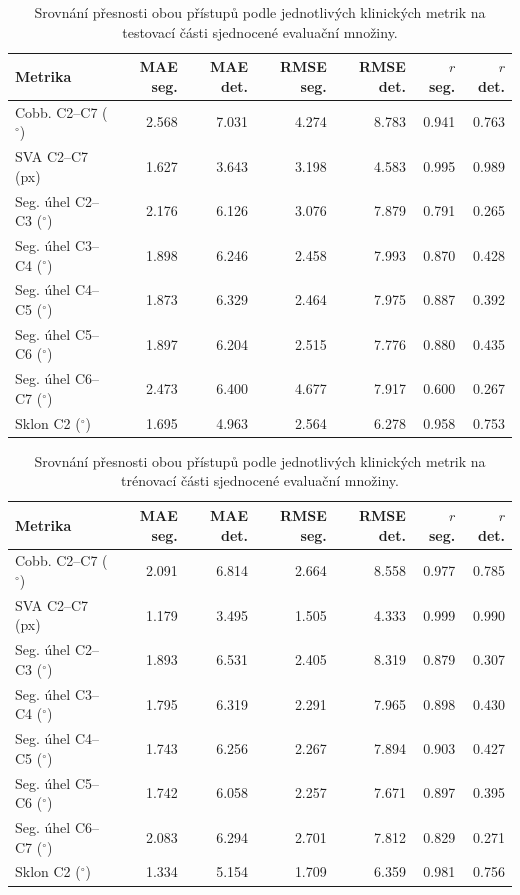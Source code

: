 \documentclass[male,czech,api_bc]{kitheses}
\begin{document}
\begin{table}[htbp]
\centering
\small
\caption{Srovnání přesnosti obou přístupů podle jednotlivých klinických metrik na testovací části sjednocené evaluační množiny.}
\label{tab:metric_comparison}
\begin{tabular}{p{3.3cm}rrrrrr}
\hline
Metrika & MAE seg. & MAE det. & RMSE seg. & RMSE det. & $r$ seg. & $r$ det. \\
\hline
Cobb. C2--C7 ($^\circ$) & 2.568 & 7.031 & 4.274 & 8.783 & 0.941 & 0.763 \\
SVA C2--C7 (px) & 1.627 & 3.643 & 3.198 & 4.583 & 0.995 & 0.989 \\
Seg. úhel C2--C3 ($^\circ$) & 2.176 & 6.126 & 3.076 & 7.879 & 0.791 & 0.265 \\
Seg. úhel C3--C4 ($^\circ$) & 1.898 & 6.246 & 2.458 & 7.993 & 0.870 & 0.428 \\
Seg. úhel C4--C5 ($^\circ$) & 1.873 & 6.329 & 2.464 & 7.975 & 0.887 & 0.392 \\
Seg. úhel C5--C6 ($^\circ$) & 1.897 & 6.204 & 2.515 & 7.776 & 0.880 & 0.435 \\
Seg. úhel C6--C7 ($^\circ$) & 2.473 & 6.400 & 4.677 & 7.917 & 0.600 & 0.267 \\
Sklon C2 ($^\circ$) & 1.695 & 4.963 & 2.564 & 6.278 & 0.958 & 0.753 \\
\hline
\end{tabular}
\normalsize
\end{table}

\begin{table}[htbp]
\centering
\small
\caption{Srovnání přesnosti obou přístupů podle jednotlivých klinických metrik na trénovací části sjednocené evaluační množiny.}
\label{tab:metric_comparison_train}
\begin{tabular}{p{3.3cm}rrrrrr}
\hline
Metrika & MAE seg. & MAE det. & RMSE seg. & RMSE det. & $r$ seg. & $r$ det. \\
\hline
Cobb. C2--C7 ($^\circ$) & 2.091 & 6.814 & 2.664 & 8.558 & 0.977 & 0.785 \\
SVA C2--C7 (px) & 1.179 & 3.495 & 1.505 & 4.333 & 0.999 & 0.990 \\
Seg. úhel C2--C3 ($^\circ$) & 1.893 & 6.531 & 2.405 & 8.319 & 0.879 & 0.307 \\
Seg. úhel C3--C4 ($^\circ$) & 1.795 & 6.319 & 2.291 & 7.965 & 0.898 & 0.430 \\
Seg. úhel C4--C5 ($^\circ$) & 1.743 & 6.256 & 2.267 & 7.894 & 0.903 & 0.427 \\
Seg. úhel C5--C6 ($^\circ$) & 1.742 & 6.058 & 2.257 & 7.671 & 0.897 & 0.395 \\
Seg. úhel C6--C7 ($^\circ$) & 2.083 & 6.294 & 2.701 & 7.812 & 0.829 & 0.271 \\
Sklon C2 ($^\circ$) & 1.334 & 5.154 & 1.709 & 6.359 & 0.981 & 0.756 \\
\hline
\end{tabular}
\normalsize
\end{table}
\end{document}
